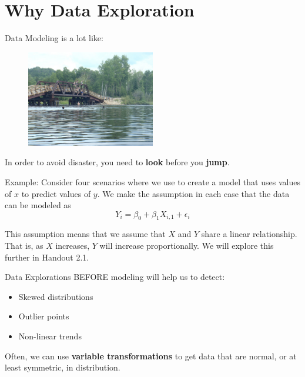 \documentclass[12pt]{../notes}
\begin{document}

\section{Why Data Exploration}

Data Modeling is a lot like:

\begin{figure}[H]
\centering
\includegraphics[width=0.5\textwidth]{../figures/module1/bridgeJumping.jpg}
\end{figure}

In order to avoid disaster, you need to \textbf{look} before you \textbf{jump}.

\nspace
Example: 
Consider four scenarios where we use to create a model that uses values of $x$ to predict values of $y$. We make the assumption in each case that the data can be modeled as 
\begin{equation}
Y_i = \beta_0 + \beta_1X_{i,1} + \epsilon_i
\end{equation}

This assumption means that we assume that $X$ and $Y$ share a linear relationship. That is, as $X$ increases, $Y$ will increase proportionally. We will explore this further in Handout 2.1.

\nspace
Data Explorations BEFORE modeling will help us to detect:
\begin{itemize}
\item Skewed distributions 
\item Outlier points
\item Non-linear trends
\end{itemize}

Often, we can use \textbf{variable transformations} to get data that are normal, or at least symmetric, in distribution. 

\begin{minipage}[l][3cm][c]{\textwidth}
\end{minipage}
\end{document}
